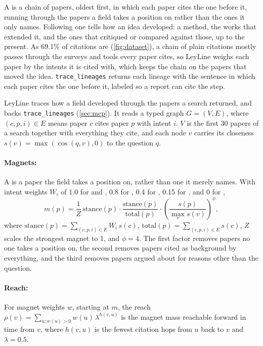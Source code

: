 A  is a chain of papers, oldest first, in which each paper cites the one before it, running through the papers a field takes a position on rather than the ones it only names. Following one tells how an idea developed: a method, the works that extended it, and the ones that critiqued or compared against those, up to the present. As 69.1\% of citations are  (\cref{fig:dataset}), a chain of plain citations mostly passes through the surveys and tools every paper cites, so LeyLine weighs each paper by the intents it is cited with, which keeps the chain on the papers that moved the idea. \texttt{trace\_lineages} returns each lineage with the sentence in which each paper cites the one before it, labeled so a report can cite the step.

LeyLine traces how a field developed through the papers a search returned, and backs \texttt{trace\_lineages} (\cref{sec:mcp}). It reads a typed graph $G = (V, E)$, where $(c, p, i) \in E$ means paper $c$ cites paper $p$ with intent $i$. $V$ is the first 30 papers of a search together with everything they cite, and each node $v$ carries its closeness $s(v) = \max(\cos(q, v), 0)$ to the question $q$.

\paragraph{Magnets:}
A  is a paper the field takes a position on, rather than one it merely names. With intent weights $W_i$ of 1.0 for  and , 0.8 for , 0.4 for , 0.15 for , and 0 for ,
\begin{equation}
    \label{eq:magnet}
    m(p) = \frac{1}{Z}\, \text{stance}(p) \cdot \frac{\text{stance}(p)}{\text{total}(p)} \cdot \left(\frac{s(p)}{\max_{v} s(v)}\right)^{\phi},
\end{equation}
where $\text{stance}(p) = \sum_{(c,p,i) \in E} W_i\, s(c)$, $\text{total}(p) = \sum_{(c,p,i) \in E} s(c)$, $Z$ scales the strongest magnet to 1, and $\phi = 4$. The first factor removes papers no one takes a position on, the second removes papers cited as background by everything, and the third removes papers argued about for reasons other than the question.

\paragraph{Reach:}
For magnet weights $w$, starting at $m$, the reach $\rho(v) = \sum_{u : w(u) > 0} w(u)\, \lambda^{h(v,u)}$ is the magnet mass reachable forward in time from $v$, where $h(v,u)$ is the fewest citation hops from $u$ back to $v$ and $\lambda = 0.5$.

